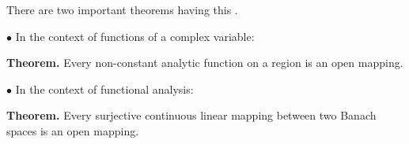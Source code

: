 \documentclass[12pt]{article}
\begin{document}
There are two important theorems having this .

$\bullet$ In the context of functions of a complex variable: 

\textbf{Theorem.} Every non-constant analytic function on a region is an open mapping.

$\bullet$ In the context of functional analysis:

\textbf{Theorem.} Every surjective continuous linear mapping between two Banach spaces is an open mapping.
\end{document}

